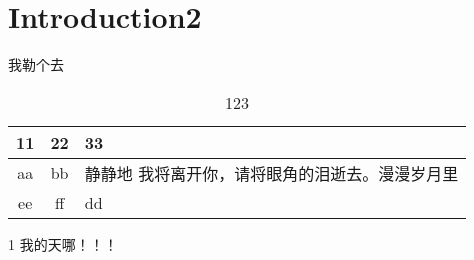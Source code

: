 \section{Introduction2}
我勒个去

\begin{table}[h]
    \caption{123}
        \begin{center}
            \begin{threeparttable}
                \begin{tabularx}{\textwidth}{cc|X}

                    \toprule
                    11&22&33\\
                    \midrule
                    aa&bb&静静地 \tnote{1} 我将离开你，请将眼角的泪逝去。漫漫岁月里\\

                    ee&ff&dd\\
                    \bottomrule

                \end{tabularx}
                \begin{tablenotes}

                    \footnotesize
                    \item[1] 我的天哪！！！
                \end{tablenotes}
            \end{threeparttable}
        \end{center}
\end{table}
